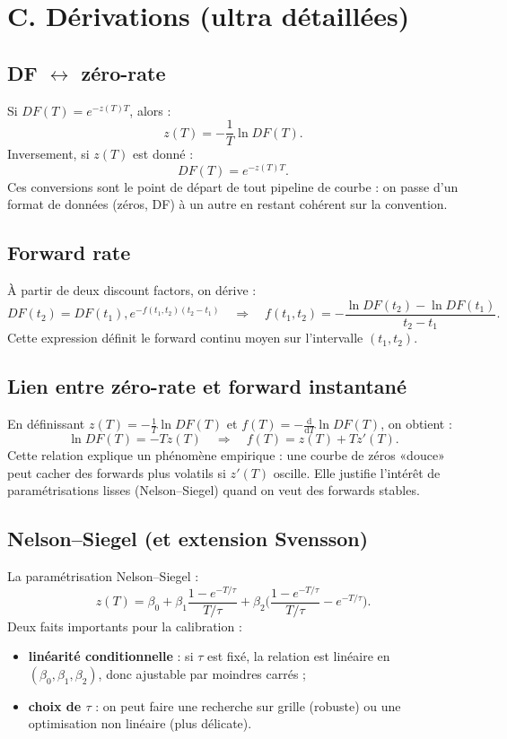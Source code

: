 \documentclass[11pt,a4paper]{report}
\theoremstyle{definition}
\theoremstyle{plain}
\theoremstyle{remark}
\newcommand{\dd}{\mathrm{d}}
\newcommand{\1}{\mathbf{1}}
\begin{document}
\section{C. Dérivations (ultra détaillées)}
\subsection*{DF $\leftrightarrow$ zéro-rate}
Si $DF(T)=e^{-z(T)T}$, alors :
\[
z(T)=-\frac{1}{T}\ln DF(T).
\]
Inversement, si $z(T)$ est donné :
\[
DF(T)=e^{-z(T)T}.
\]
Ces conversions sont le point de départ de tout pipeline de courbe : on passe d'un format de données (zéros, DF) à un autre en restant cohérent sur la convention.

\subsection*{Forward rate}
À partir de deux discount factors, on dérive :
\[
DF(t_2)=DF(t_1),e^{-f(t_1,t_2)(t_2-t_1)}
\quad\Rightarrow\quad
f(t_1,t_2)=-\frac{\ln DF(t_2)-\ln DF(t_1)}{t_2-t_1}.
\]
Cette expression définit le forward continu moyen sur l'intervalle $(t_1,t_2)$.

\subsection*{Lien entre zéro-rate et forward instantané}
En définissant $z(T)=-\frac1T\ln DF(T)$ et $f(T)=-\frac{\dd}{\dd T}\ln DF(T)$, on obtient :
\[
\ln DF(T)=-Tz(T)\quad\Rightarrow\quad f(T)=z(T)+Tz'(T).
\]
Cette relation explique un phénomène empirique : une courbe de zéros «douce» peut cacher des forwards plus volatils si $z'(T)$ oscille.
Elle justifie l'intérêt de paramétrisations lisses (Nelson--Siegel) quand on veut des forwards stables.

\subsection*{Nelson--Siegel (et extension Svensson)}
La paramétrisation Nelson--Siegel :
\[
z(T)=\beta_0+\beta_1\frac{1-e^{-T/\tau}}{T/\tau}+\beta_2\Big(\frac{1-e^{-T/\tau}}{T/\tau}-e^{-T/\tau}\Big).
\]
Deux faits importants pour la calibration :
\begin{itemize}[leftmargin=*]
\item \textbf{linéarité conditionnelle} : si $\tau$ est fixé, la relation est linéaire en $(\beta_0,\beta_1,\beta_2)$, donc ajustable par moindres carrés ;
\item \textbf{choix de $\tau$} : on peut faire une recherche sur grille (robuste) ou une optimisation non linéaire (plus délicate).
\end{itemize}
\end{document}
